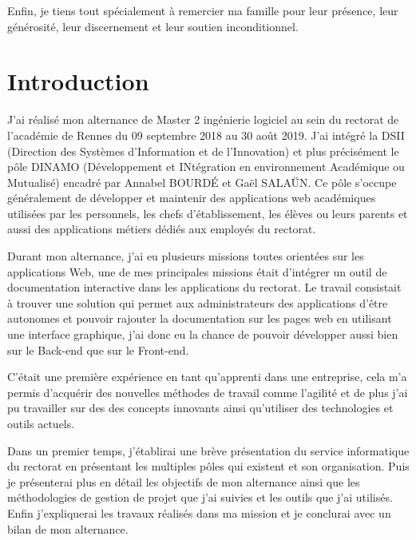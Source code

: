 \documentclass[12pt]{article}
\begin{document}
Enfin, je tiens tout spécialement à remercier ma famille pour leur présence, leur générosité, leur discernement et leur soutien inconditionnel. 


\section{Introduction}

J'ai réalisé mon alternance de Master 2 ingénierie logiciel au sein du rectorat de l'académie de Rennes du 09 septembre 2018 au 30 août 2019. J'ai intégré la DSII (Direction des Systèmes d'Information et de l'Innovation) et plus précisément le pôle DINAMO (Développement et INtégration en environnement Académique ou Mutualisé) encadré par Annabel BOURDÉ et Gaël SALAÜN. Ce pôle s'occupe généralement de développer et maintenir des applications web académiques utilisées par les personnels, les chefs d'établissement, les élèves  ou leurs parents et aussi des applications métiers dédiés aux employés du rectorat.\newline


Durant mon alternance, j'ai eu plusieurs missions toutes orientées sur les  applications Web, une de mes principales missions était d'intégrer un outil de documentation interactive dans les applications du rectorat. Le travail consistait à trouver une solution qui permet aux administrateurs des applications d'être autonomes et pouvoir rajouter la documentation sur les pages web en utilisant une interface graphique, j'ai donc eu la chance de pouvoir développer aussi bien sur le Back-end que sur le Front-end.\newline   

C'était une première expérience en tant qu'apprenti dans une entreprise, cela m'a permis d'acquérir des nouvelles méthodes de travail comme l'agilité et de plus j'ai pu travailler sur des des concepts innovants ainsi qu'utiliser des technologies et outils actuels.\newline


Dans un premier temps, j'établirai une brève présentation du service informatique du rectorat en présentant les multiples pôles qui existent et son organisation. Puis je présenterai plus en détail les objectifs de mon alternance ainsi que les méthodologies de gestion de projet que j'ai suivies et les outils que j'ai utilisés. Enfin j'expliquerai les travaux réalisés dans ma mission et je conclurai avec un bilan de mon alternance.

\newpage
\end{document}
